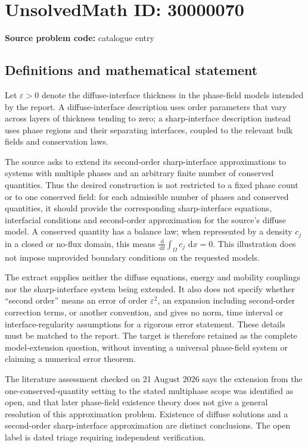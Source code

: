 \documentclass[11pt]{article}
\newcommand{\dd}{\,\mathrm{d}}
\begin{document}
\section*{UnsolvedMath ID: 30000070}
\textbf{Source problem code:} catalogue entry
\subsection{Definitions and mathematical statement}
Let $\varepsilon>0$ denote the diffuse-interface thickness in the phase-field models intended by the report. A diffuse-interface description uses order parameters that vary across layers of thickness tending to zero; a sharp-interface description instead uses phase regions and their separating interfaces, coupled to the relevant bulk fields and conservation laws.

The source asks to extend its second-order sharp-interface approximations to systems with multiple phases and an arbitrary finite number of conserved quantities. Thus the desired construction is not restricted to a fixed phase count or to one conserved field: for each admissible number of phases and conserved quantities, it should provide the corresponding sharp-interface equations, interfacial conditions and second-order approximation for the source's diffuse model. A conserved quantity has a balance law; when represented by a density $c_j$ in a closed or no-flux domain, this means $\frac{\dd}{\dd t}\int_\Omega c_j\,\dd x=0$. This illustration does not impose unprovided boundary conditions on the requested models.

The extract supplies neither the diffuse equations, energy and mobility couplings nor the sharp-interface system being extended. It also does not specify whether ``second order'' means an error of order $\varepsilon^2$, an expansion including second-order correction terms, or another convention, and gives no norm, time interval or interface-regularity assumptions for a rigorous error statement. These details must be matched to the report. The target is therefore retained as the complete model-extension question, without inventing a universal phase-field system or claiming a numerical error theorem.

The literature assessment checked on 21 August 2026 says the extension from the one-conserved-quantity setting to the stated multiphase scope was identified as open, and that later phase-field existence theory does not give a general resolution of this approximation problem. Existence of diffuse solutions and a second-order sharp-interface approximation are distinct conclusions. The open label is dated triage requiring independent verification.
\end{document}
